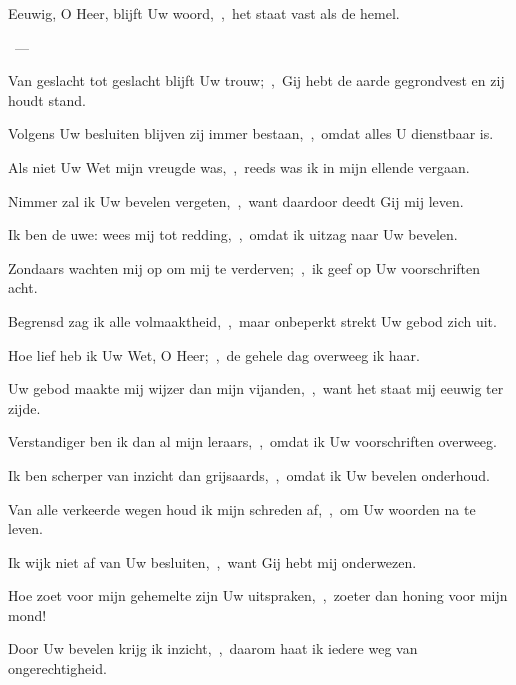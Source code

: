 \documentclass[12pt,twoside,a5paper]{article}
\begin{document}
\begin{halfparskip}
   Eeuwig, O Heer, blijft Uw woord,~\sep\ het staat vast als de hemel.

  ~--- 

  Van geslacht tot geslacht blijft Uw trouw;~\sep\ Gij hebt de aarde gegrondvest en zij houdt stand.

  Volgens Uw besluiten blijven zij immer bestaan,~\sep\ omdat alles U dienstbaar is.

  Als niet Uw Wet mijn vreugde was,~\sep\ reeds was ik in mijn ellende vergaan.

  Nimmer zal ik Uw bevelen vergeten,~\sep\ want daardoor deedt Gij mij leven.

  Ik ben de uwe: wees mij tot redding,~\sep\ omdat ik uitzag naar Uw bevelen.

  Zondaars wachten mij op om mij te verderven;~\sep\ ik geef op Uw voorschriften acht.

  Begrensd zag ik alle volmaaktheid,~\sep\ maar onbeperkt strekt Uw gebod zich uit.
\end{halfparskip}

\begin{halfparskip}
   Hoe lief heb ik Uw Wet, O Heer;~\sep\ de gehele dag overweeg ik haar.

  Uw gebod maakte mij wijzer dan mijn vijanden,~\sep\ want het staat mij eeuwig ter zijde.

  Verstandiger ben ik dan al mijn leraars,~\sep\ omdat ik Uw voorschriften overweeg.

  Ik ben scherper van inzicht dan grijsaards,~\sep\ omdat ik Uw bevelen onderhoud.

  Van alle verkeerde wegen houd ik mijn schreden af,~\sep\ om Uw woorden na te leven.

  Ik wijk niet af van Uw besluiten,~\sep\ want Gij hebt mij onderwezen.

  Hoe zoet voor mijn gehemelte zijn Uw uitspraken,~\sep\ zoeter dan honing voor mijn mond!

  Door Uw bevelen krijg ik inzicht,~\sep\ daarom haat ik iedere weg van ongerechtigheid.
\end{halfparskip}
\end{document}
